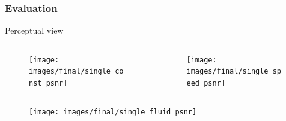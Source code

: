 \documentclass[18pt, xcolor=table]{beamer}
\begin{document}
\begin{frame}[t]
  \frametitle{Evaluation}
  \large{Perceptual view}
  \vspace{-0.5cm}
  \begin{columns}[t]
    \begin{column}{0.5\textwidth}
      \begin{center}
        \begin{figure}[htb]
          \texttt{[image: images/final/single\_const\_psnr]}
        \end{figure}
      \end{center}
    \end{column}
    \begin{column}{0.5\textwidth}
      \begin{center}
        \begin{figure}[htb]
          \texttt{[image: images/final/single\_speed\_psnr]}
        \end{figure}
      \end{center}
    \end{column}
  \end{columns}
  \begin{center}
    \begin{figure}[htb]
      \texttt{[image: images/final/single\_fluid\_psnr]}
    \end{figure}
  \end{center}
\end{frame}
\end{document}
